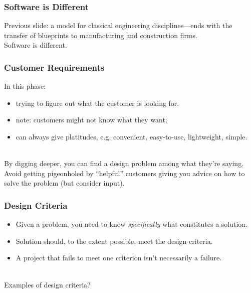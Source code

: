 \begin{frame}
\frametitle{Software is Different}

 
\begin{changemargin}{1cm}
Previous slide: a model for classical engineering disciplines---ends with
the transfer of blueprints to manufacturing and construction
firms. \\[1em]
\Large
Software is different.
\end{changemargin}

\end{frame}

\begin{frame}
\frametitle{Customer Requirements}

\begin{changemargin}{1cm}
In this phase:
\begin{itemize}
\item trying to figure out what the
customer is looking for.
\item note: customers might not know what they want;
\item can always give platitudes, e.g. convenient, easy-to-use, lightweight, simple.
\end{itemize}
~\\
By digging deeper, you can find a design problem among what they're
saying.\\[1em]

Avoid getting pigeonholed by ``helpful'' customers giving you advice on how
to solve the problem (but consider input).
\end{changemargin}

\end{frame}

\begin{frame}
\frametitle{Design Criteria}

\begin{changemargin}{1cm}
\begin{itemize}
\item Given a problem, you need to know
\emph{specifically} what constitutes a solution. 

\item Solution should, to the extent possible, meet the design criteria.

\item A project that fails to meet one criterion isn't necessarily a failure.
\end{itemize}
~\\

\alert{Examples of design criteria?}
\end{changemargin}

\end{frame}


